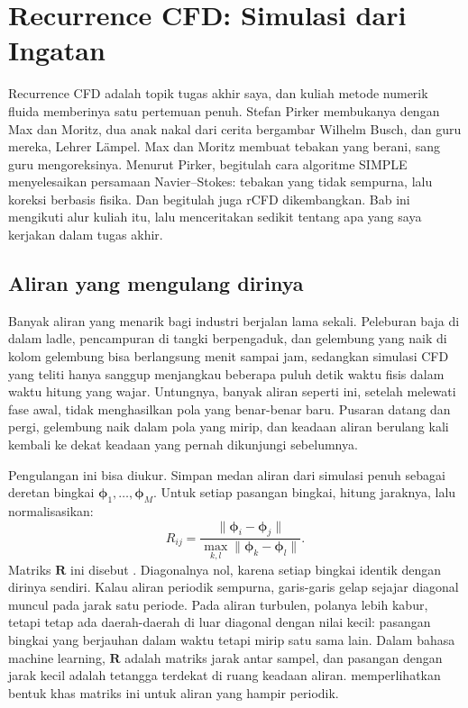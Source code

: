 \chapter{Recurrence CFD: Simulasi dari Ingatan}
\label{ch:rcfd}

Recurrence CFD adalah topik tugas akhir saya, dan kuliah metode numerik fluida memberinya satu pertemuan
penuh. Stefan Pirker membukanya dengan Max dan Moritz, dua anak nakal dari cerita bergambar Wilhelm
Busch, dan guru mereka, Lehrer Lämpel. Max dan Moritz membuat tebakan yang berani, sang guru
mengoreksinya. Menurut Pirker, begitulah cara algoritme SIMPLE menyelesaikan persamaan Navier--Stokes:
tebakan yang tidak sempurna, lalu koreksi berbasis fisika. Dan begitulah juga rCFD dikembangkan.
Bab ini mengikuti alur kuliah itu, lalu menceritakan sedikit tentang apa yang saya kerjakan dalam tugas
akhir.

\section{Aliran yang mengulang dirinya}

Banyak aliran yang menarik bagi industri berjalan lama sekali. Peleburan baja di dalam ladle,
pencampuran di tangki berpengaduk, dan gelembung yang naik di kolom gelembung bisa berlangsung menit
sampai jam, sedangkan simulasi CFD yang teliti hanya sanggup menjangkau beberapa puluh detik waktu fisis
dalam waktu hitung yang wajar. Untungnya, banyak aliran seperti ini, setelah melewati fase awal, tidak
menghasilkan pola yang benar-benar baru. Pusaran datang dan pergi, gelembung naik dalam pola yang
mirip, dan keadaan aliran berulang kali kembali ke dekat keadaan yang pernah dikunjungi sebelumnya.

Pengulangan ini bisa diukur. Simpan medan aliran dari simulasi penuh sebagai deretan bingkai
$\bm\phi_1,\dots,\bm\phi_M$. Untuk setiap pasangan bingkai, hitung jaraknya, lalu normalisasikan:
\begin{equation}
R_{ij}=\frac{\|\bm\phi_i-\bm\phi_j\|}{\max_{k,l}\|\bm\phi_k-\bm\phi_l\|}.
\end{equation}
Matriks $\bm R$ ini disebut . Diagonalnya nol, karena setiap bingkai identik
dengan dirinya sendiri. Kalau aliran periodik sempurna, garis-garis gelap sejajar diagonal muncul pada
jarak satu periode. Pada aliran turbulen, polanya lebih kabur, tetapi tetap ada daerah-daerah di luar
diagonal dengan nilai kecil: pasangan bingkai yang berjauhan dalam waktu tetapi mirip satu sama lain.
Dalam bahasa machine learning, $\bm R$ adalah matriks jarak antar sampel, dan pasangan dengan jarak kecil
adalah tetangga terdekat di ruang keadaan aliran.  memperlihatkan bentuk khas matriks ini
untuk aliran yang hampir periodik.

